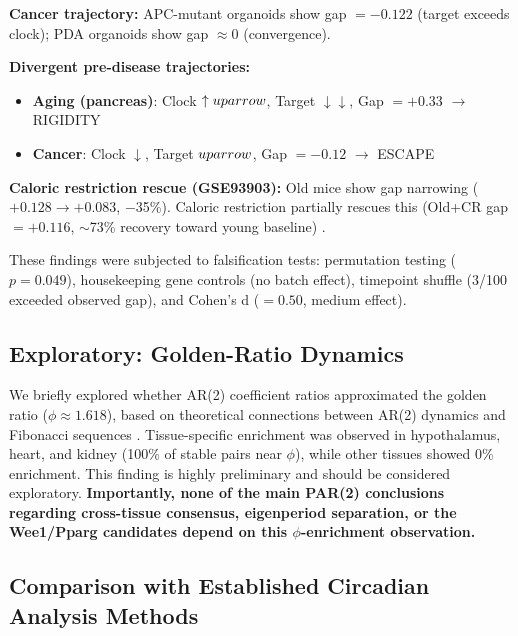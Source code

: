 \documentclass[11pt,a4paper]{article}
\begin{document}
\textbf{Cancer trajectory:} APC-mutant organoids show gap $= -0.122$ (target exceeds clock); PDA organoids show gap $\approx 0$ (convergence).

\textbf{Divergent pre-disease trajectories:}
\begin{itemize}[noitemsep]
    \item \textbf{Aging (pancreas)}: Clock $\uparrow\\uparrow$, Target $\downarrow\downarrow$, Gap $= +0.33$ $\rightarrow$ RIGIDITY
    \item \textbf{Cancer}: Clock $\downarrow$, Target $\\uparrow$, Gap $= -0.12$ $\rightarrow$ ESCAPE
\end{itemize}

\textbf{Caloric restriction rescue (GSE93903):} Old mice show gap narrowing ($+0.128 \rightarrow +0.083$, $-$35\%). Caloric restriction partially rescues this (Old+CR gap $= +0.116$, $\sim$73\% recovery toward young baseline) \citep{sato2017}.

These findings were subjected to falsification tests: permutation testing ($p = 0.049$), housekeeping gene controls (no batch effect), timepoint shuffle (3/100 exceeded observed gap), and Cohen's d ($= 0.50$, medium effect).

\subsection{Exploratory: Golden-Ratio Dynamics}

We briefly explored whether AR(2) coefficient ratios approximated the golden ratio ($\phi \approx 1.618$), based on theoretical connections between AR(2) dynamics and Fibonacci sequences \citep{boman2025fibonacci}. Tissue-specific enrichment was observed in hypothalamus, heart, and kidney (100\% of stable pairs near $\phi$), while other tissues showed 0\% enrichment. This finding is highly preliminary and should be considered exploratory. \textbf{Importantly, none of the main PAR(2) conclusions regarding cross-tissue consensus, eigenperiod separation, or the Wee1/Pparg candidates depend on this $\phi$-enrichment observation.}

\subsection{Comparison with Established Circadian Analysis Methods}
\end{document}
